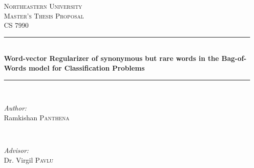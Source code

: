 \begin{titlepage}

\newcommand{\HRule}{\rule{\linewidth}{0.5mm}} %

\center %
 

\textsc{\LARGE Northeastern University}\\[1.5cm] %
\textsc{\Large Master's Thesis Proposal}\\[0.5cm] %
\textsc{\large CS 7990}\\[0.5cm] %


\HRule \\[0.4cm]
{\Large \bfseries Word-vector Regularizer of synonymous but rare words in the Bag-of-Words model for Classification Problems}\\[0.4cm] %
\HRule \\[1.5cm]
 

\begin{minipage}{0.4\textwidth}
\begin{flushleft} \large
\emph{Author:}\\
Ramkishan \textsc{Panthena} %
\end{flushleft}
\end{minipage}
~
\begin{minipage}{0.4\textwidth}
\begin{flushright} \large
\emph{Advisor:} \\
Dr. Virgil \textsc{Pavlu} %
\end{flushright}
\end{minipage}\\[2cm]


\end{titlepage}

